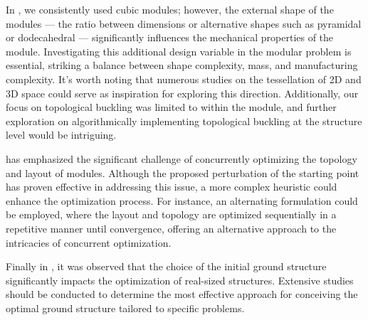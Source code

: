 In , we consistently used cubic modules; however, the external shape of the modules — \ie the ratio between dimensions or alternative shapes such as pyramidal or dodecahedral — significantly influences the mechanical properties of the module. Investigating this additional design variable in the modular problem is essential, striking a balance between shape complexity, mass, and manufacturing complexity. It's worth noting that numerous studies on the tessellation of 2D and 3D space could serve as inspiration for exploring this direction. Additionally, our focus on topological buckling was limited to within the module, and further exploration on algorithmically implementing topological buckling at the structure level would be intriguing.

 has emphasized the significant challenge of concurrently optimizing the topology and layout of modules. Although the proposed perturbation of the starting point has proven effective in addressing this issue, a more complex heuristic could enhance the optimization process. For instance, an alternating formulation could be employed, where the layout and topology are optimized sequentially in a repetitive manner until convergence, offering an alternative approach to the intricacies of concurrent optimization.

Finally in , it was observed that the choice of the initial ground structure significantly impacts the optimization of real-sized structures. Extensive studies should be conducted to determine the most effective approach for conceiving the optimal ground structure tailored to specific problems.